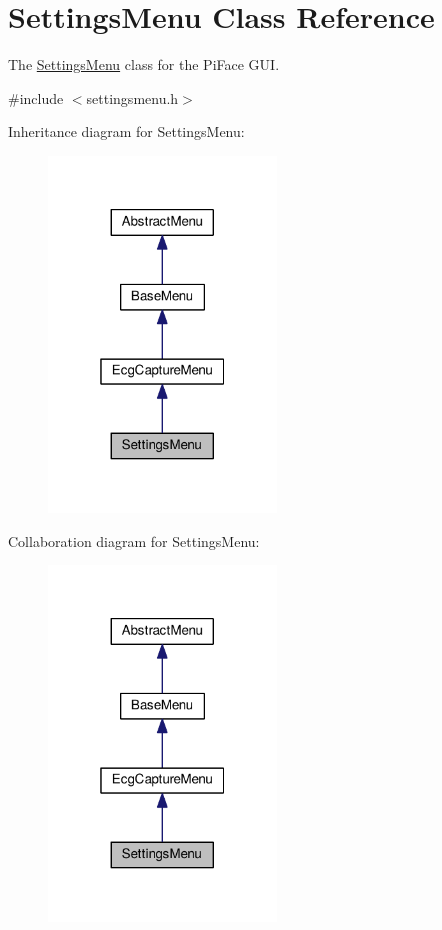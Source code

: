 \hypertarget{classSettingsMenu}{}\section{Settings\+Menu Class Reference}
\label{classSettingsMenu}


The \hyperlink{classSettingsMenu}{Settings\+Menu} class for the Pi\+Face G\+UI.  




{\ttfamily \#include $<$settingsmenu.\+h$>$}



Inheritance diagram for Settings\+Menu\+:\nopagebreak
\begin{figure}[H]
\begin{center}
\leavevmode
\includegraphics[width=172pt]{classSettingsMenu__inherit__graph}
\end{center}
\end{figure}


Collaboration diagram for Settings\+Menu\+:\nopagebreak
\begin{figure}[H]
\begin{center}
\leavevmode
\includegraphics[width=172pt]{classSettingsMenu__coll__graph}
\end{center}
\end{figure}
